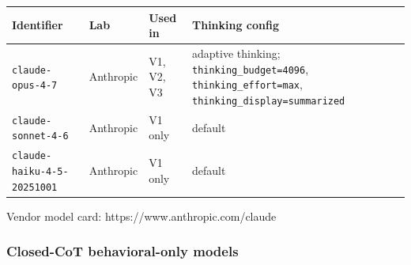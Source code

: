 \documentclass[
]{article}
\begin{document}
\begin{longtable}[]{@{}
  >{\raggedright\arraybackslash}p{}
  >{\raggedright\arraybackslash}p{}
  >{\raggedright\arraybackslash}p{}
  >{\raggedright\arraybackslash}p{}@{}}
\toprule\noalign{}
\begin{minipage}[b]{\linewidth}\raggedright
Identifier
\end{minipage} & \begin{minipage}[b]{\linewidth}\raggedright
Lab
\end{minipage} & \begin{minipage}[b]{\linewidth}\raggedright
Used in
\end{minipage} & \begin{minipage}[b]{\linewidth}\raggedright
Thinking config
\end{minipage} \\
\midrule\noalign{}
\endhead
\bottomrule\noalign{}
\endlastfoot
\texttt{claude-opus-4-7} & Anthropic & V1, V2, V3 & adaptive thinking;
\texttt{thinking\_budget=4096}, \texttt{thinking\_effort=max},
\texttt{thinking\_display=summarized} \\
\texttt{claude-sonnet-4-6} & Anthropic & V1 only & default \\
\texttt{claude-haiku-4-5-20251001} & Anthropic & V1 only & default \\
\end{longtable}

Vendor model card: https://www.anthropic.com/claude

\subsubsection{Closed-CoT behavioral-only
models}\label{closed-cot-behavioral-only-models}
\end{document}
